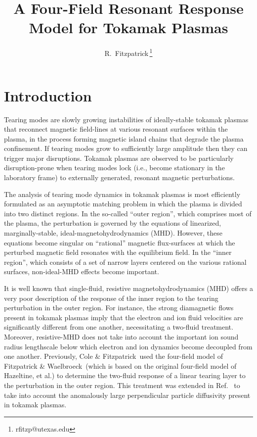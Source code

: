 \documentclass[12pt,prb,aps]{revtex4-1}
\begin{document}
\title{A Four-Field Resonant Response Model for Tokamak Plasmas}

\author{R.~Fitzpatrick\,\footnote{rfitzp@utexas.edu}}

\begin{abstract}

\end{abstract}

\maketitle

\section{Introduction}
Tearing modes are slowly growing instabilities of ideally-stable tokamak plasmas that reconnect magnetic field-lines
at various resonant surfaces within the plasma, in the process forming magnetic island chains that degrade the plasma confinement.\cite{wes}
If tearing modes grow to sufficiently large amplitude then they can trigger major disruptions.\cite{wes1}  Tokamak
plasmas are observed to be particularly disruption-prone when tearing modes lock (i.e., become stationary in the
laboratory frame) to externally generated, resonant magnetic perturbations.\cite{vries}  

The analysis  of tearing mode dynamics in tokamak plasmas is most efficiently formulated as an asymptotic matching problem in which the  plasma is  divided into two distinct regions.\cite{fkr}    In the so-called ``outer region'', which comprises most
of the plasma, the perturbation is governed by the equations of linearized, marginally-stable, ideal-magnetohydrodynamics (MHD).
However, these equations become singular on   ``rational'' magnetic flux-surfaces at which the perturbed magnetic field resonates with the equilibrium field. In the ``inner region'', which
consists of a set of narrow layers centered on the various rational surfaces, non-ideal-MHD effects   become important.

It is well known that single-fluid, resistive magnetohydrodynamics (MHD) offers a very poor description of
the response of the inner region to the tearing perturbation in the outer region. 
For instance, the strong  diamagnetic flows present in tokamak plasmas imply that the  electron and ion fluid velocities are significantly different from one another,
necessitating a two-fluid treatment.\cite{ara} Moreover, resistive-MHD does not take  into account the important  ion sound radius lengthscale below which electron and ion dynamics become decoupled from one another.\cite{drake,wal} Previously, Cole \& Fitzpatrick\,\cite{cole} used the four-field model
of Fitzpatrick \& Waelbroeck\,\cite{fw} (which is based on the original four-field model of Hazeltine, et al.\cite{haz}) 
to determine the two-fluid response of a linear tearing layer to the perturbation in the outer region. This treatment was extended in Ref.~ to take into account the
 anomalously large perpendicular  particle diffusivity  present in tokamak plasmas. 
 
\end{document}

